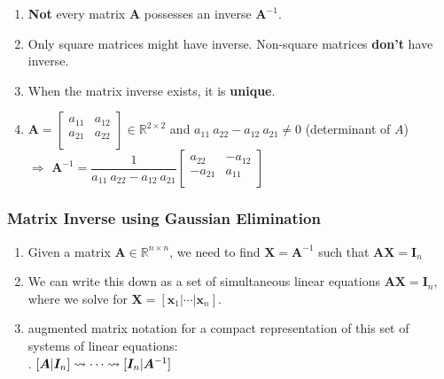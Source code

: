 \begin{enumerate}
    \item \textbf{Not} every matrix $\bm{A}$ possesses an inverse $\bm{A}^{-1}$.
    \hfill \cite{mfml/book/mml/Deisenroth-Faisal-Ong}

    \item Only square matrices might have inverse. Non-square matrices \textbf{don't} have inverse.

    \item When the matrix inverse exists, it is \textbf{unique}.
    \hfill \cite{mfml/book/mml/Deisenroth-Faisal-Ong}

    \item $
        \bm{A} = \begin{bmatrix}
            a_{11} & a_{12} \\
            a_{21} & a_{22} \\
        \end{bmatrix} 
        \in \mathbb{R}^{2\times 2}
    $
    \hspace{1cm} and \hspace{1cm}
    $a_{11}\ a_{22} - a_{12}\ a_{21} \neq 0$ (determinant of $A$)\\[0.4cm] 
    $\Rightarrow$
    $
        \bm{A}^{-1} = 
        \dfrac{1}{a_{11}\ a_{22} - a_{12}\ a_{21}}
        \begin{bmatrix}
            a_{22} & -a_{12} \\
            -a_{21} & a_{11} \\
        \end{bmatrix}
    $
    \hfill \cite{mfml/book/mml/Deisenroth-Faisal-Ong}

\end{enumerate}



\subsubsection{Matrix Inverse using Gaussian Elimination}

\begin{enumerate}
    \item Given a matrix $\bm{A} \in \mathbb{R}^{n\times n}$, we need to find $\bm{X} = \bm{A}^{-1}$ such that $\bm{A}\bm{X} = \bm{I}_n$
    \hfill \cite{mfml/book/mml/Deisenroth-Faisal-Ong}
    
    \item We can write this down as a set of simultaneous linear equations $\bm{A}\bm{X} = \bm{I}_n$, where we solve for $\bm{X} = [\bm{x}_1| \cdots |\bm{x}_n]$. 
    \hfill \cite{mfml/book/mml/Deisenroth-Faisal-Ong}

    \item augmented matrix notation for a compact representation of this set of systems of linear equations:
    \hfill \cite{mfml/book/mml/Deisenroth-Faisal-Ong}
    \\
    .\hfill
    $
        [\bm{A}|\bm{I}_n] 
        \mathrel{\leadsto} \cdots \mathrel{\leadsto} 
        [\bm{I}_n|\bm{A}^{-1}]
    $
    \hfill \cite{mfml/book/mml/Deisenroth-Faisal-Ong}

    
\end{enumerate}





